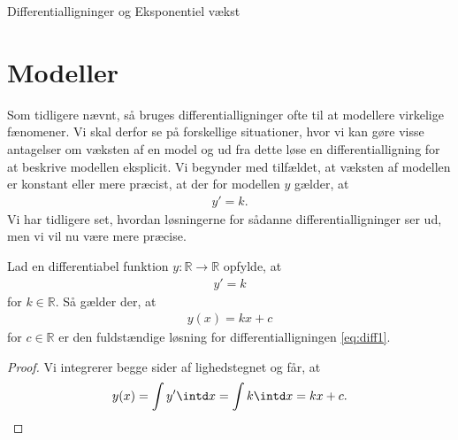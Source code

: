 \begin{center}
\Huge
Differentialligninger og Eksponentiel vækst
\end{center}


\section*{Modeller}

Som tidligere nævnt, så bruges differentialligninger ofte til at modellere virkelige fænomener. Vi skal derfor se på forskellige situationer, hvor vi kan gøre visse antagelser om væksten af en model og ud fra dette løse en differentialligning for at beskrive modellen eksplicit. Vi begynder med tilfældet, at væksten af modellen er konstant eller mere præcist, at der for modellen $y$ gælder, at
\begin{align*}
	y' = k.
\end{align*}
Vi har tidligere set, hvordan løsningerne for sådanne differentialligninger ser ud, men vi vil nu være mere præcise.
\begin{setn}
	Lad en differentiabel funktion $y: \mathbb{R} \to \mathbb{R}$ opfylde, at 
	\begin{align}\label{eq:diff1}
		y' = k
	\end{align}
	for $k\in \mathbb{R}$. Så gælder der, at
	\begin{align*}
		y(x) = kx + c
	\end{align*}
	for $c\in \mathbb{R}$ er den fuldstændige løsning for differentialligningen \eqref{eq:diff1}.
\end{setn}
\begin{proof}
	Vi integrerer begge sider af lighedstegnet og får, at 
	\begin{align*}
		y(x) = \int y' \intd x = \int k \intd x = kx + c.
	\end{align*}
\end{proof}

